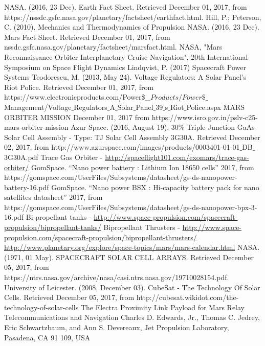 \documentclass[a4paper, oneside, 11pt]{article}
\begin{document}
\begin{thebibliography}{99}
  NASA. (2016, 23 Dec). Earth Fact Sheet. Retrieved December 01, 2017, from 
https://nssdc.gsfc.nasa.gov/planetary/factsheet/earthfact.html.
 Hill, P.; Peterson, C. (2010).  Mechanics and Thermodynamics of Propulsion
 NASA. (2016, 23 Dec). Mars Fact Sheet. Retrieved December 01, 2017, from nssdc.gsfc.nasa.gov/planetary/factsheet/marsfact.html.
 NASA, "Mars Reconnaissance Orbiter
Interplanetary Cruise Navigation", 20th International Symposium on Space Flight Dynamics
 Lindqvist, P. (2017) Spacecraft Power Systems
 Teodorescu, M. (2013, May 24). Voltage Regulators: A Solar Panel's Riot Police. Retrieved December 01, 2017, from {https://www.electronicproducts.com/Power\$\_$Products/Power\$\_$Management/Voltage$\_$Regulators$\_$A$\_$Solar$\_$Panel$\_$39$\_$s$\_$Riot$\_$Police.aspx}
 MARS ORBITER MISSION December 01, 2017 from https://www.isro.gov.in/pslv-c25-mars-orbiter-mission
  Azur Space. (2016, August 19). 30\% Triple Junction GaAs Solar Cell Assembly - Type: TJ Solar Cell Assembly 3G30A. Retrieved December 02, 2017, from {http://www.azurspace.com/images/products/0003401-01-01$\_$DB$\_$3G30A.pdf}
 Trace Gas Orbiter - \url{http://spaceflight101.com/exomars/trace-gas-orbiter/}
  GomSpace. “Nano power battery : Lithium Ion 18650 cells” 2017, from
{https://gomspace.com/UserFiles/Subsystems/datasheet/gs-ds-nanopower-battery-16.pdf}
  GomSpace. “Nano power BSX : Hi-capacity battery pack for nano satellites datasheet” 2017, from
{https://gomspace.com/UserFiles/Subsystems/datasheet/gs-ds-nanopower-bpx-3-16.pdf}
 Bi-propellant tanks - \url{http://www.space-propulsion.com/spacecraft-propulsion/bipropellant-tanks/}
 Bipropellant Thrusters - \url{http://www.space-propulsion.com/spacecraft-propulsion/bipropellant-thrusters/}
  \url{http://www.planetary.org/explore/space-topics/mars/mars-calendar.html}
 NASA. (1971, 01 May). SPACECRAFT
SOLAR CELL ARRAYS. Retrieved December 05, 2017, from 
https://ntrs.nasa.gov/archive/nasa/casi.ntrs.nasa.gov/19710028154.pdf.
 University of Leicester. (2008, December 03). CubeSat - The Technology Of Solar Cells. Retrieved December 05, 2017, from http://cubesat.wikidot.com/the-technology-of-solar-cells
 The Electra Proximity Link Payload for Mars Relay TeIecommunications and Navigation Charles D. Edwards, Jr., Thomas C. Jedrey, Eric Schwartzbaum, and Ann S. Devereaux, Jet Propulsion Laboratory, Pasadena, CA 91 109, USA
 
\end{thebibliography}
\end{document}
